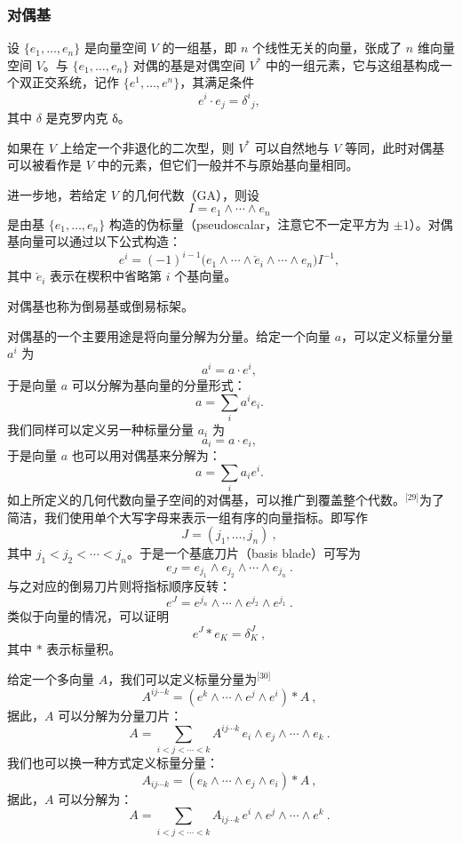 \subsubsection{对偶基}
设 $\{e_{1},\ldots ,e_{n}\}$ 是向量空间 $V$ 的一组基，即 $n$ 个线性无关的向量，张成了 $n$ 维向量空间 $V$。与 $\{e_{1},\ldots ,e_{n}\}$ 对偶的基是对偶空间 $V^{*}$ 中的一组元素，它与这组基构成一个双正交系统，记作 $\{e^{1},\ldots ,e^{n}\}$，其满足条件
$$
e^{i}\cdot e_{j} = \delta^{i}{}_{j},~
$$
其中 $\delta$ 是克罗内克 δ。

如果在 $V$ 上给定一个非退化的二次型，则 $V^{*}$ 可以自然地与 $V$ 等同，此时对偶基可以被看作是 $V$ 中的元素，但它们一般并不与原始基向量相同。

进一步地，若给定 $V$ 的几何代数（GA），则设
$$
I = e_{1} \wedge \cdots \wedge e_{n}~
$$
是由基 $\{e_{1},\ldots ,e_{n}\}$ 构造的伪标量（pseudoscalar，注意它不一定平方为 $\pm 1$）。对偶基向量可以通过以下公式构造：
$$
e^{i} = (-1)^{i-1} \big( e_{1} \wedge \cdots \wedge \check{e}_{i} \wedge \cdots \wedge e_{n} \big) I^{-1},~
$$
其中 $\check{e}_{i}$ 表示在楔积中省略第 $i$ 个基向量。

对偶基也称为倒易基或倒易标架。

对偶基的一个主要用途是将向量分解为分量。给定一个向量 $a$，可以定义标量分量 $a^{i}$ 为
$$
a^{i} = a \cdot e^{i},~
$$
于是向量 $a$ 可以分解为基向量的分量形式：
$$
a = \sum_{i} a^{i} e_{i}.~
$$
我们同样可以定义另一种标量分量 $a_{i}$ 为
$$
a_{i} = a \cdot e_{i},~
$$
于是向量 $a$ 也可以用对偶基来分解为：
$$
a = \sum_{i} a_{i} e^{i}.~
$$
如上所定义的几何代数向量子空间的对偶基，可以推广到覆盖整个代数。\(^\text{[29]}\)为了简洁，我们使用单个大写字母来表示一组有序的向量指标。即写作
$$
J = (j_{1}, \dots , j_{n}) \ ,~
$$
其中 $j_{1} < j_{2} < \cdots < j_{n}$。于是一个基底刀片（basis blade）可写为
$$
e_{J} = e_{j_{1}} \wedge e_{j_{2}} \wedge \cdots \wedge e_{j_{n}} \ .~
$$
与之对应的倒易刀片则将指标顺序反转：
$$
e^{J} = e^{j_{n}} \wedge \cdots \wedge e^{j_{2}} \wedge e^{j_{1}} \ .~
$$
类似于向量的情况，可以证明
$$
e^{J} * e_{K} = \delta^{J}_{K} \ ,~
$$
其中 $*$ 表示标量积。

给定一个多向量 $A$，我们可以定义标量分量为\(^\text{[30]}\)
$$
A^{ij\cdots k} = (e^{k} \wedge \cdots \wedge e^{j} \wedge e^{i}) * A \ ,~
$$
据此，$A$ 可以分解为分量刀片：
$$
A = \sum_{i<j<\cdots <k} A^{ij\cdots k} \, e_{i} \wedge e_{j} \wedge \cdots \wedge e_{k} \ .~
$$
我们也可以换一种方式定义标量分量：
$$
A_{ij\cdots k} = (e_{k} \wedge \cdots \wedge e_{j} \wedge e_{i}) * A \ ,~
$$
据此，$A$ 可以分解为：
$$
A = \sum_{i<j<\cdots <k} A_{ij\cdots k} \, e^{i} \wedge e^{j} \wedge \cdots \wedge e^{k} \ .~
$$
